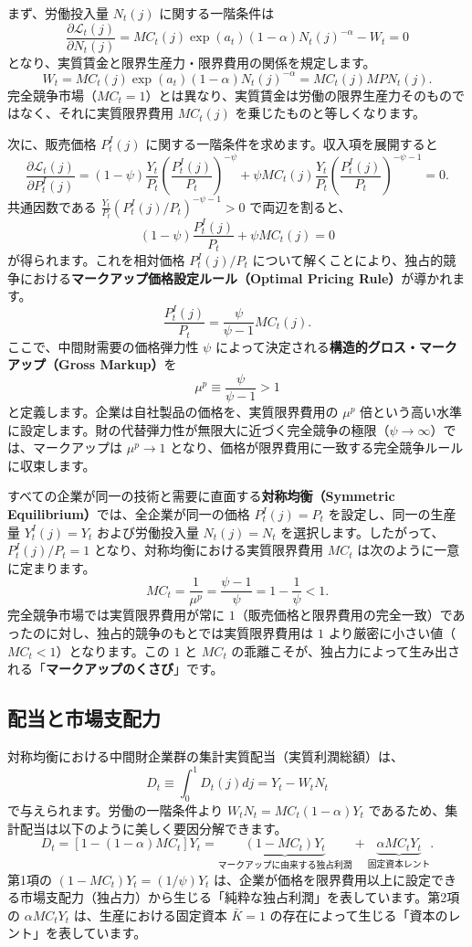 \documentclass[
  japanese,
  lualatex,
  ja=standard,
  12pt,
  a4paper]{ltjsarticle}
\begin{document}
まず、労働投入量 \(N_t(j)\) に関する一階条件は \[
\frac{\partial \mathcal{L}_t(j)}{\partial N_t(j)} = MC_t(j) \exp(a_t) (1-\alpha) N_t(j)^{-\alpha} - W_t = 0
\] となり、実質賃金と限界生産力・限界費用の関係を規定します。 \[
W_t = MC_t(j) \exp(a_t) (1-\alpha) N_t(j)^{-\alpha} = MC_t(j) MPN_t(j).
\]
完全競争市場（\(MC_t = 1\)）とは異なり、実質賃金は労働の限界生産力そのものではなく、それに実質限界費用
\(MC_t(j)\) を乗じたものと等しくなります。

次に、販売価格 \(P_t^I(j)\)
に関する一階条件を求めます。収入項を展開すると \[
\frac{\partial \mathcal{L}_t(j)}{\partial P_t^I(j)} = (1-\psi) \frac{Y_t}{P_t} \left( \frac{P_t^I(j)}{P_t} \right)^{-\psi} + \psi MC_t(j) \frac{Y_t}{P_t} \left( \frac{P_t^I(j)}{P_t} \right)^{-\psi - 1} = 0.
\] 共通因数である \(\frac{Y_t}{P_t} (P_t^I(j)/P_t)^{-\psi - 1} > 0\)
で両辺を割ると、 \[
(1-\psi) \frac{P_t^I(j)}{P_t} + \psi MC_t(j) = 0
\] が得られます。これを相対価格 \(P_t^I(j)/P_t\)
について解くことにより、独占的競争における\textbf{マークアップ価格設定ルール（Optimal
Pricing Rule）}が導かれます。 \[
\frac{P_t^I(j)}{P_t} = \frac{\psi}{\psi-1} MC_t(j).
\] ここで、中間財需要の価格弾力性 \(\psi\)
によって決定される\textbf{構造的グロス・マークアップ（Gross Markup）}を
\[
\mu^p \equiv \frac{\psi}{\psi-1} > 1
\] と定義します。企業は自社製品の価格を、実質限界費用の \(\mu^p\)
倍という高い水準に設定します。財の代替弾力性が無限大に近づく完全競争の極限（\(\psi \to \infty\)）では、マークアップは
\(\mu^p \to 1\)
となり、価格が限界費用に一致する完全競争ルールに収束します。

すべての企業が同一の技術と需要に直面する\textbf{対称均衡（Symmetric
Equilibrium）}では、全企業が同一の価格 \(P_t^I(j) = P_t\)
を設定し、同一の生産量 \(Y_t^I(j) = Y_t\) および労働投入量
\(N_t(j) = N_t\) を選択します。したがって、\(P_t^I(j)/P_t = 1\)
となり、対称均衡における実質限界費用 \(MC_t\)
は次のように一意に定まります。 \[
MC_t = \frac{1}{\mu^p} = \frac{\psi-1}{\psi} = 1 - \frac{1}{\psi} < 1.
\] 完全競争市場では実質限界費用が常に
\(1\)（販売価格と限界費用の完全一致）であったのに対し、独占的競争のもとでは実質限界費用は
\(1\) より厳密に小さい値（\(MC_t < 1\)）となります。この \(1\) と
\(MC_t\)
の乖離こそが、独占力によって生み出される「\textbf{マークアップのくさび}」です。

\subsection{配当と市場支配力}\label{ux914dux5f53ux3068ux5e02ux5834ux652fux914dux529b}

対称均衡における中間財企業群の集計実質配当（実質利潤総額）は、 \[
D_t \equiv \int_0^1 D_t(j) dj = Y_t - W_t N_t
\] で与えられます。労働の一階条件より \(W_t N_t = MC_t (1-\alpha) Y_t\)
であるため、集計配当は以下のように美しく要因分解できます。 \[
D_t = \left[ 1 - (1-\alpha) MC_t \right] Y_t = \underbrace{(1 - MC_t) Y_t}_{\text{マークアップに由来する独占利潤}} + \underbrace{\alpha MC_t Y_t}_{\text{固定資本レント}}.
\] 第1項の \((1-MC_t)Y_t = (1/\psi)Y_t\)
は、企業が価格を限界費用以上に設定できる市場支配力（独占力）から生じる「純粋な独占利潤」を表しています。第2項の
\(\alpha MC_t Y_t\) は、生産における固定資本 \(\bar{K}=1\)
の存在によって生じる「資本のレント」を表しています。
\end{document}
